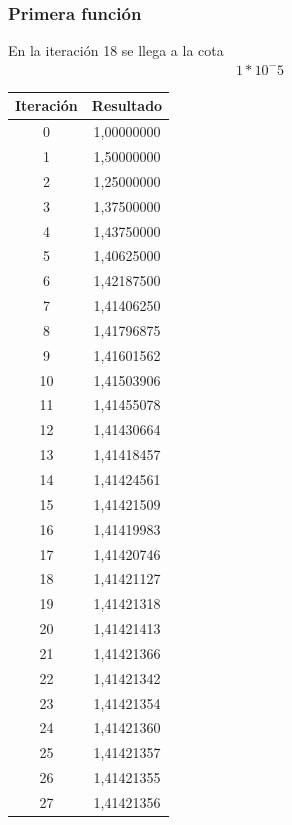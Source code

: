 \documentclass[titlepage,a4paper]{article}
\begin{document}
\subsubsection{Primera función}\label{sec:bis1}
En la iteración 18 se llega a la cota \begin{align}1*10^-5
\end{align}
\begin{tabular}{| c | c |}
\hline
    Iteración & Resultado \\ \hline
    0     & 1,00000000 \\
    1     & 1,50000000 \\
    2     & 1,25000000 \\
    3     & 1,37500000 \\
    4     & 1,43750000 \\
    5     & 1,40625000 \\
    6     & 1,42187500 \\
    7     & 1,41406250 \\
    8     & 1,41796875 \\
    9     & 1,41601562 \\
    10    & 1,41503906 \\
    11    & 1,41455078 \\
    12    & 1,41430664 \\
    13    & 1,41418457 \\
    14    & 1,41424561 \\
    15    & 1,41421509 \\
    16    & 1,41419983 \\
    17    & 1,41420746 \\
    18    & 1,41421127 \\
    19    & 1,41421318 \\
    20    & 1,41421413 \\
    21    & 1,41421366 \\
    22    & 1,41421342 \\
    23    & 1,41421354 \\
    24    & 1,41421360 \\
    25    & 1,41421357 \\
    26    & 1,41421355 \\
    27    & 1,41421356 \\ \hline
\end{tabular}
\end{document}

